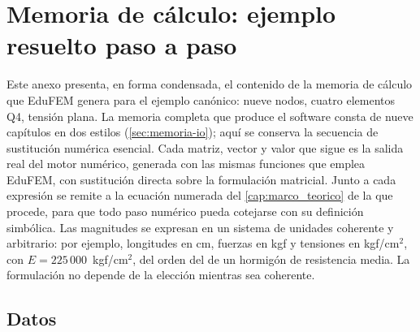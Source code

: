 

\renewcommand{\valE}{225\,000}
\renewcommand{\valDfactor}{234\,375}
\renewcommand{\detJinline}{4{,}7604;\ 3{,}0283;\ 4{,}4717;\ 2{,}7396}
\renewcommand{\Dmat}{\begin{bmatrix}
234\,375{,}00 & 46\,875{,}00 & 0{,}00 \\
46\,875{,}00 & 234\,375{,}00 & 0{,}00 \\
0{,}00 & 0{,}00 & 93\,750{,}00
\end{bmatrix}}

\chapter{Memoria de cálculo: ejemplo resuelto paso a paso}
\label{anexo:memoria}

Este anexo presenta, en forma condensada, el contenido de la memoria de cálculo que EduFEM genera para el ejemplo canónico: nueve nodos, cuatro elementos Q4, tensión plana. La memoria completa que produce el software consta de nueve capítulos en dos estilos (\autoref{sec:memoria-io}); aquí se conserva la secuencia de sustitución numérica esencial. Cada matriz, vector y valor que sigue es la salida real del motor numérico, generada con las mismas funciones que emplea EduFEM, con sustitución directa sobre la formulación matricial. Junto a cada expresión se remite a la ecuación numerada del \autoref{cap:marco_teorico} de la que procede, para que todo paso numérico pueda cotejarse con su definición simbólica. Las magnitudes se expresan en un sistema de unidades coherente y arbitrario: por ejemplo, longitudes en cm, fuerzas en kgf y tensiones en kgf/cm$^2$, con $E = \valE$~kgf/cm$^2$, del orden del de un hormigón de resistencia media. La formulación no depende de la elección mientras sea coherente.

\section{Datos}

